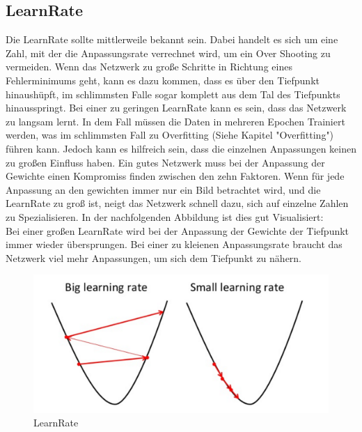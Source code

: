 \documentclass[12pt]{article}
\begin{document}
\subsection{LearnRate}
Die LearnRate sollte mittlerweile bekannt sein. Dabei handelt es sich um eine Zahl, mit der die Anpassungsrate verrechnet wird, um ein Over Shooting zu vermeiden. Wenn das Netzwerk zu große Schritte in Richtung eines Fehlerminimums geht, kann es dazu kommen, dass es über den Tiefpunkt hinaushüpft, im schlimmsten Falle sogar komplett aus dem Tal des Tiefpunkts hinausspringt. Bei einer zu geringen LearnRate kann es sein, dass das Netzwerk zu langsam lernt. In dem Fall müssen die Daten in mehreren Epochen Trainiert werden, was im schlimmsten Fall zu Overfitting (Siehe Kapitel "Overfitting") führen kann. Jedoch kann es hilfreich sein, dass die einzelnen Anpassungen keinen zu großen Einfluss haben. Ein gutes Netzwerk muss bei der Anpassung der Gewichte einen Kompromiss finden zwischen den zehn Faktoren. Wenn für jede Anpassung an den gewichten immer nur ein Bild betrachtet wird, und die LearnRate zu groß ist, neigt das Netzwerk schnell dazu, sich auf einzelne Zahlen zu Spezialisieren. In der nachfolgenden Abbildung ist dies gut Visualisiert:\\
Bei einer großen LearnRate wird bei der Anpassung der Gewichte der Tiefpunkt immer wieder übersprungen. Bei einer zu kleienen Anpassungsrate braucht das Netzwerk viel mehr Anpassungen, um sich dem Tiefpunkt zu nähern.
\begin{figure}[H]
\centering
\includegraphics[scale=0.250]{./Images/Pasted image 20230917181526.png}
\caption{LearnRate}
\label{LearnRate}
\end{figure}
\end{document}
